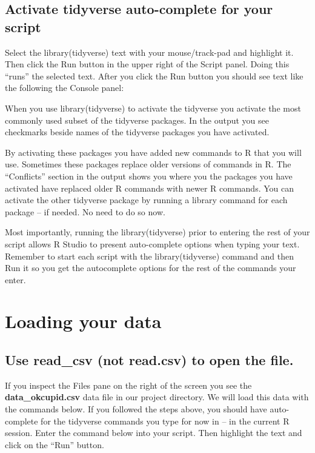 \documentclass[
]{krantz}
\begin{document}
\hypertarget{activate-tidyverse-auto-complete-for-your-script}{%
\subsection{Activate tidyverse auto-complete for your script}\label{activate-tidyverse-auto-complete-for-your-script}}

Select the library(tidyverse) text with your mouse/track-pad and highlight it. Then click the Run button in the upper right of the Script panel. Doing this ``runs'' the selected text. After you click the Run button you should see text like the following the Console panel:

When you use library(tidyverse) to activate the tidyverse you activate the most commonly used subset of the tidyverse packages. In the output you see checkmarks beside names of the tidyverse packages you have activated.

By activating these packages you have added new commands to R that you will use. Sometimes these packages replace older versions of commands in R. The ``Conflicts'' section in the output shows you where you the packages you have activated have replaced older R commands with newer R commands. You can activate the other tidyverse package by running a library command for each package -- if needed. No need to do so now.

Most importantly, running the library(tidyverse) prior to entering the rest of your script allows R Studio to present auto-complete options when typing your text. Remember to start each script with the library(tidyverse) command and then Run it so you get the autocomplete options for the rest of the commands your enter.

\hypertarget{loading-your-data}{%
\section{Loading your data}\label{loading-your-data}}

\hypertarget{use-read_csv-not-read.csv-to-open-the-file.}{%
\subsection{Use read\_csv (not read.csv) to open the file.}\label{use-read_csv-not-read.csv-to-open-the-file.}}

If you inspect the Files pane on the right of the screen you see the \textbf{data\_okcupid.csv} data file in our project directory. We will load this data with the commands below. If you followed the steps above, you should have auto-complete for the tidyverse commands you type for now in -- in the current R session. Enter the command below into your script. Then highlight the text and click on the ``Run'' button.
\end{document}
